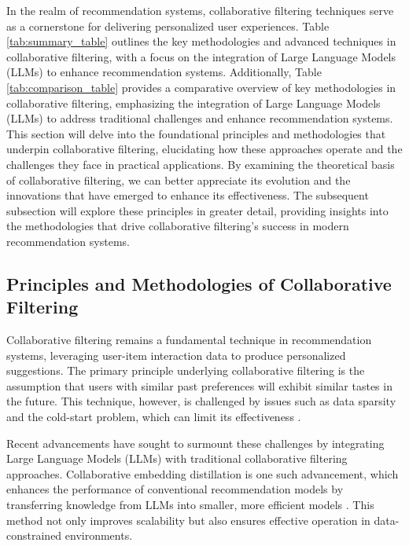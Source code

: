 

In the realm of recommendation systems, collaborative filtering techniques serve as a cornerstone for delivering personalized user experiences. Table \ref{tab:summary_table} outlines the key methodologies and advanced techniques in collaborative filtering, with a focus on the integration of Large Language Models (LLMs) to enhance recommendation systems. Additionally, Table \ref{tab:comparison_table} provides a comparative overview of key methodologies in collaborative filtering, emphasizing the integration of Large Language Models (LLMs) to address traditional challenges and enhance recommendation systems. This section will delve into the foundational principles and methodologies that underpin collaborative filtering, elucidating how these approaches operate and the challenges they face in practical applications. By examining the theoretical basis of collaborative filtering, we can better appreciate its evolution and the innovations that have emerged to enhance its effectiveness. The subsequent subsection will explore these principles in greater detail, providing insights into the methodologies that drive collaborative filtering's success in modern recommendation systems.








\subsection{Principles and Methodologies of Collaborative Filtering} \label{subsec:Principles and Methodologies of Collaborative Filtering}



Collaborative filtering remains a fundamental technique in recommendation systems, leveraging user-item interaction data to produce personalized suggestions. The primary principle underlying collaborative filtering is the assumption that users with similar past preferences will exhibit similar tastes in the future. This technique, however, is challenged by issues such as data sparsity and the cold-start problem, which can limit its effectiveness \cite{xu2024llmbasedrecommendersbestsimple}.

Recent advancements have sought to surmount these challenges by integrating Large Language Models (LLMs) with traditional collaborative filtering approaches. Collaborative embedding distillation is one such advancement, which enhances the performance of conventional recommendation models by transferring knowledge from LLMs into smaller, more efficient models \cite{cui2024distillationmattersempoweringsequential}. This method not only improves scalability but also ensures effective operation in data-constrained environments.

